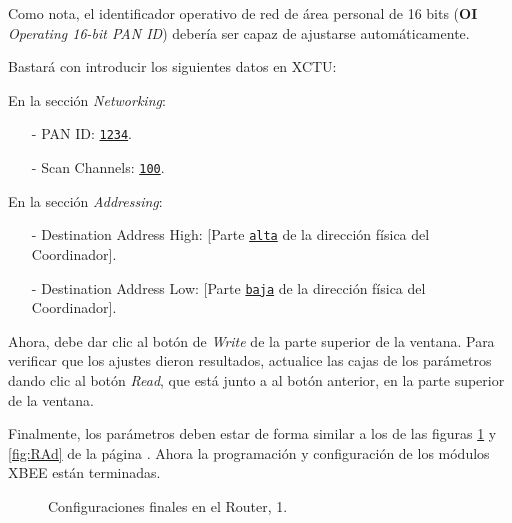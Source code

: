 Como nota, el identificador operativo de red de área personal de 16 bits (\textbf{OI} \textit{Operating 16-bit PAN ID}) debería ser capaz de ajustarse automáticamente\footnotemark.


Bastará con introducir los siguientes datos en XCTU: 

En la sección \textit{Networking}:
\begin{itemize}
	\item[-] PAN ID: \texttt{\underline{1234}}.
	\item[-] Scan Channels: \texttt{\underline{100}}.
\end{itemize}

En la sección \textit{Addressing}:
\begin{itemize}
	\item[-] Destination Address High: [Parte \texttt{\underline{alta}} de la dirección física del 
	Coordinador].
	\item[-] Destination Address Low: [Parte \texttt{\underline{baja}} de la dirección física del 
	Coordinador].
\end{itemize}

Ahora, debe dar clic al botón de \textit{Write} de la parte superior de la ventana. Para verificar que los ajustes dieron resultados, actualice las cajas de los parámetros dando clic al botón \textit{Read}, que está junto a al botón anterior, en la parte superior de la ventana.

Finalmente, los parámetros deben estar de forma similar a los de las figuras \ref{fig:RNet} y \ref{fig:RAd} de la página \pageref{fig:RNet}. Ahora la programación y configuración de los módulos XBEE están terminadas.

\begin{figure}[H] %
\caption{Configuraciones finales en el Router, 1.}
\label{fig:RNet}
\end{figure}

